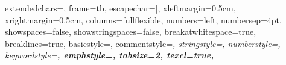 \usepackage[margin=5pt,font={small, singlespacing}, labelfont={small}, justification=centering, labelsep=period]{caption}
\captionsetup{belowskip=0pt}
\usepackage[numbers]{natbib}
\usepackage{bibentry}
\ifx\undefined\selectlanguageifdefined
\def\selectlanguageifdefined#1{}\else\fi
\ifx\undefined\BibEmph
\def\BibEmph#1{\emph{#1}}\else\fi
\usepackage{tikz}
\usetikzlibrary{tikzmark}
\usetikzlibrary{trees, calc, automata}
\usetikzlibrary{arrows,arrows.meta, shapes}
\usetikzlibrary{positioning}
\usepackage{listings}

\lstset
{
		extendedchars=\true, %
		frame=tb, %
		escapechar=|, %
		xleftmargin=0.5cm,
		xrightmargin=0.5cm,
		columns=fullflexible,
		numbers=left,                    %
		numbersep=4pt,                   %
		showspaces=false,
		showstringspaces=false,
		breakatwhitespace=true,         %
		breaklines=true,                 %
		basicstyle=\color{black}\small\sffamily,%
		commentstyle=\color{gray}\itshape, %
		stringstyle=\color{orange},
		numberstyle=\footnotesize\color{gray},
		keywordstyle=\color{blue}\bfseries,
		emphstyle={\color{blue}\bfseries},
		tabsize=2,
		texcl=true,
}

\renewcommand\lstlistlistingname{\cyr\CYRL\cyri\cyrs\cyrt\cyri\cyrn\cyrg\cyri}


